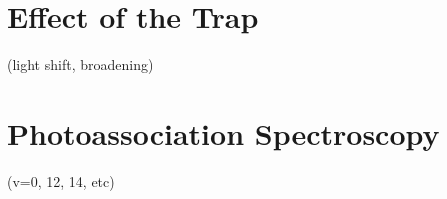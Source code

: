 \section{Effect of the Trap}

(light shift, broadening)

\section{Photoassociation Spectroscopy}
(v=0, 12, 14, etc)
